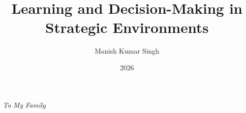 

\clearpage
\hypersetup{pageanchor=false}



\title{Learning and Decision-Making in Strategic Environments}
\author{Manish Kumar Singh}
\date{2026}






\maketitle
\thispagestyle{empty}
\newpage
\null
\thispagestyle{empty}
\newpage
\begin{dedication}
{\it\large To My Family}
\end{dedication}

